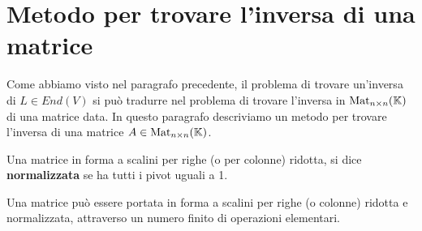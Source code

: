 \section{Metodo per trovare l'inversa di una matrice}
Come abbiamo visto nel paragrafo precedente, il problema di trovare un'inversa
di $L \in End(V)$ si può tradurre nel problema di trovare l'inversa in
$\operatorname{Mat}_{n \times n}(\mathbb{K})$ di una matrice data. In questo paragrafo descriviamo
un metodo per trovare l'inversa di una matrice $A \in \operatorname{Mat}_{n \times n}(\mathbb{K})$.

\begin{definition}
	Una matrice in forma a scalini per righe (o per colonne) ridotta, si dice
	\textbf{normalizzata} se ha tutti i pivot uguali a 1.
\end{definition}

\begin{observation}
	Una matrice può essere portata in forma a scalini per righe (o colonne)
	ridotta e normalizzata, attraverso un numero finito di operazioni elementari.
\end{observation}

